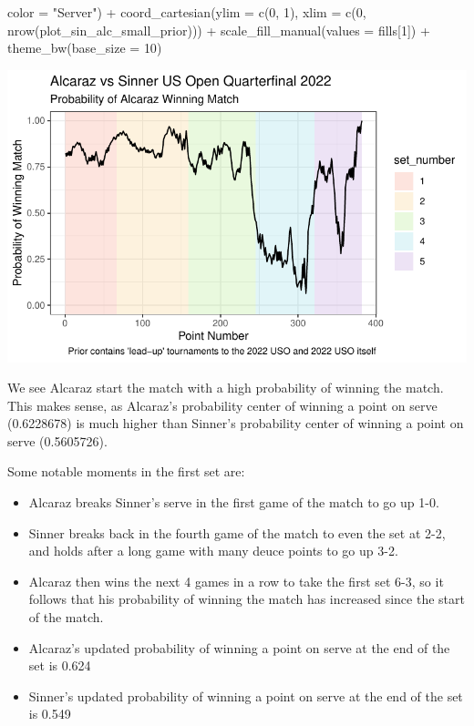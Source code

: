 \documentclass[
  letterpaper,
  DIV=11,
  numbers=noendperiod]{scrartcl}
\newenvironment{Shaded}{\begin{snugshade}}{\end{snugshade}}
\newcommand{\AttributeTok}[1]{\textcolor[rgb]{0.40,0.45,0.13}{#1}}
\newcommand{\DecValTok}[1]{\textcolor[rgb]{0.68,0.00,0.00}{#1}}
\newcommand{\FunctionTok}[1]{\textcolor[rgb]{0.28,0.35,0.67}{#1}}
\newcommand{\NormalTok}[1]{\textcolor[rgb]{0.00,0.23,0.31}{#1}}
\newcommand{\SpecialCharTok}[1]{\textcolor[rgb]{0.37,0.37,0.37}{#1}}
\newcommand{\StringTok}[1]{\textcolor[rgb]{0.13,0.47,0.30}{#1}}
\providecommand{\tightlist}{%
  \setlength{\itemsep}{0pt}\setlength{\parskip}{0pt}}\usepackage{longtable,booktabs,array}
\begin{document}
\begin{Shaded}
\begin{Highlighting}[]
       \AttributeTok{color =} \StringTok{"Server"}\NormalTok{) }\SpecialCharTok{+}
  \FunctionTok{coord\_cartesian}\NormalTok{(}\AttributeTok{ylim =} \FunctionTok{c}\NormalTok{(}\DecValTok{0}\NormalTok{, }\DecValTok{1}\NormalTok{),}
                  \AttributeTok{xlim =} \FunctionTok{c}\NormalTok{(}\DecValTok{0}\NormalTok{, }\FunctionTok{nrow}\NormalTok{(plot\_sin\_alc\_small\_prior))) }\SpecialCharTok{+}
  \FunctionTok{scale\_fill\_manual}\NormalTok{(}\AttributeTok{values =}\NormalTok{ fills[}\DecValTok{1}\NormalTok{]) }\SpecialCharTok{+}
  \FunctionTok{theme\_bw}\NormalTok{(}\AttributeTok{base\_size =} \DecValTok{10}\NormalTok{)}
\end{Highlighting}
\end{Shaded}

\includegraphics{Project_Write_Up_files/figure-pdf/unnamed-chunk-20-1.pdf}

\linespread{2}

We see Alcaraz start the match with a high probability of winning the
match. This makes sense, as Alcaraz's probability center of winning a
point on serve (0.6228678) is much higher than Sinner's probability
center of winning a point on serve (0.5605726).

Some notable moments in the first set are:

\begin{itemize}
\tightlist
\item
  Alcaraz breaks Sinner's serve in the first game of the match to go up
  1-0.
\item
  Sinner breaks back in the fourth game of the match to even the set at
  2-2, and holds after a long game with many deuce points to go up 3-2.
\item
  Alcaraz then wins the next 4 games in a row to take the first set 6-3,
  so it follows that his probability of winning the match has increased
  since the start of the match.
\item
  Alcaraz's updated probability of winning a point on serve at the end
  of the set is 0.624
\item
  Sinner's updated probability of winning a point on serve at the end of
  the set is 0.549
\end{itemize}
\end{document}
